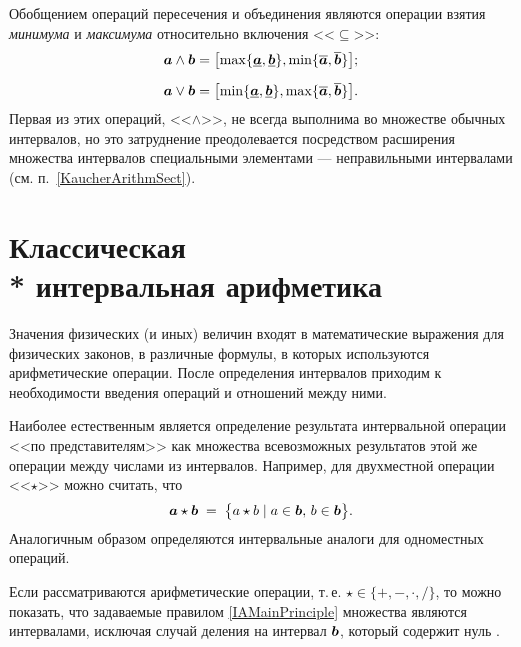 \documentclass[a5paper,openany]{book}
\newcommand{\mbf}[1]{\protect\text{\boldmath$#1$}}
\newcommand{\ov}{\overline}
\newcommand{\un}{\underline}
\begin{document}
{Обобщением операций пересечения и объединения являются операции взятия \emph{минимума} 
и \emph{максимума} относительно включения <<$\subseteq$>>:  
\begin{align} 
	\mbf{a}\wedge\mbf{b} &= \label{InteMinExpr}
	\bigl[\max\{\un{\mbf{a}}, \un{\mbf{b}}\}, \min\{\ov{\mbf{a}}, \ov{\mbf{b}}\}\bigr];
	\\[2mm]
	\mbf{a}\vee\mbf{b} &= \label{InteMaxExpr}
	\bigl[\min\{\un{\mbf{a}}, \un{\mbf{b}}\}, \max\{\ov{\mbf{a}}, \ov{\mbf{b}}\}\bigr].  
\end{align} 
Первая из этих операций, 
<<$\wedge$>>, не всегда выполнима во множестве обычных интервалов, но это затруднение 
преодолевается посредством расширения множества интервалов специальными элементами 
--- неправильными интервалами (см.  п.~\ref{KaucherArithmSect}). 


\section[Классическая интервальная арифметика]%
{Классическая \\* интервальная арифметика} \label{ClassicArithmSect} 


Значения физических (и иных) величин входят в математические выражения для физических законов, в различные формулы, в которых используются арифметические операции.
После определения интервалов приходим к необходимости введения операций и отношений между ними. 

Наиболее естественным является определение результата интервальной операции <<по представителям>>
как множества всевозможных результатов этой же операции между числами из интервалов. 
Например, для двухместной операции <<$\star$>> можно 
считать, что 
\begin{equation} 
	\label{IAMainPrinciple} 
	\mbf{a}\star\mbf{b}\; = 
	\;\bigl\{ a\star b \mid a\in\mbf{b}, \,b\in\mbf{b} \bigr\}.   
\end{equation} 
Аналогичным образом определяются интервальные аналоги для одноместных 
операций. 

Если рассматриваются арифметические операции, т.\,е. $\star\in\{ +, -, \cdot, / \}$, 
то можно показать, что задаваемые правилом \eqref{IAMainPrinciple} множества являются интервалами, исключая 
случай деления на интервал 
$\mbf{b}$, который содержит нуль \cite{SSharyBook}. 

}
\end{document}
